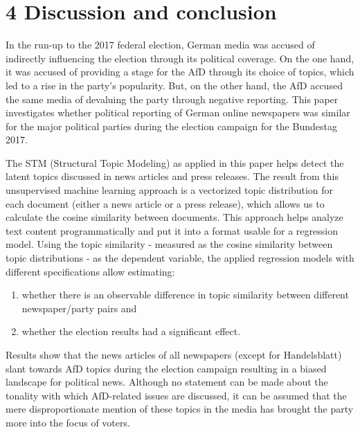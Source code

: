 \documentclass[
  12pt,
]{article}
\providecommand{\tightlist}{%
  \setlength{\itemsep}{0pt}\setlength{\parskip}{0pt}}
\begin{document}
\pagebreak

\hypertarget{discussion-and-conclusion}{%
\section{4 Discussion and conclusion}\label{discussion-and-conclusion}}

In the run-up to the 2017 federal election, German media was accused of
indirectly influencing the election through its political coverage. On
the one hand, it was accused of providing a stage for the AfD through
its choice of topics, which led to a rise in the party's popularity.
But, on the other hand, the AfD accused the same media of devaluing the
party through negative reporting. This paper investigates whether
political reporting of German online newspapers was similar for the
major political parties during the election campaign for the Bundestag
2017.

The STM (Structural Topic Modeling) as applied in this paper helps
detect the latent topics discussed in news articles and press releases.
The result from this unsupervised machine learning approach is a
vectorized topic distribution for each document (either a news article
or a press release), which allows us to calculate the cosine similarity
between documents. This approach helps analyze text content
programmatically and put it into a format usable for a regression model.
Using the topic similarity - measured as the cosine similarity between
topic distributions - as the dependent variable, the applied regression
models with different specifications allow estimating:

\begin{enumerate}
\def\labelenumi{\alph{enumi})}
\tightlist
\item
  whether there is an observable difference in topic similarity between
  different newspaper/party pairs and
\item
  whether the election results had a significant effect.
\end{enumerate}

Results show that the news articles of all newspapers (except for
Handelsblatt) slant towards AfD topics during the election campaign
resulting in a biased landscape for political news. Although no
statement can be made about the tonality with which AfD-related issues
are discussed, it can be assumed that the mere disproportionate mention
of these topics in the media has brought the party more into the focus
of voters.
\end{document}
